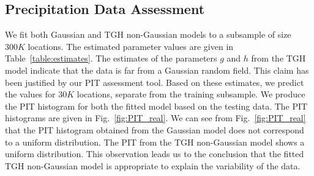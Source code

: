 \documentclass[conference]{IEEEtran}
\begin{document}




\subsection{Precipitation Data Assessment}  
We fit both Gaussian and TGH non-Gaussian models to a subsample of 
size $300K$ locations. The estimated parameter values are 
given in Table~\ref{table:estimates}. The estimates of the 
parameters $g$ and $h$ from the TGH model indicate that 
the data is far from a Gaussian random field. This claim has 
been justified by our PIT assessment tool. Based on these 
estimates, we predict the values for $30K$ locations, separate 
from the training subsample. We produce the PIT histogram for 
both the fitted model based on the testing data. The PIT histograms
are given in Fig.~\ref{fig:PIT_real}. We can see from Fig.~\ref{fig:PIT_real} that the PIT histogram obtained from the Gaussian model does not correspond to a uniform distribution. The PIT
from the TGH non-Gaussian model shows a uniform distribution. This observation leads us to the conclusion that the fitted TGH non-Gaussian model 
is appropriate to explain the variability of the data. 
\end{document}
